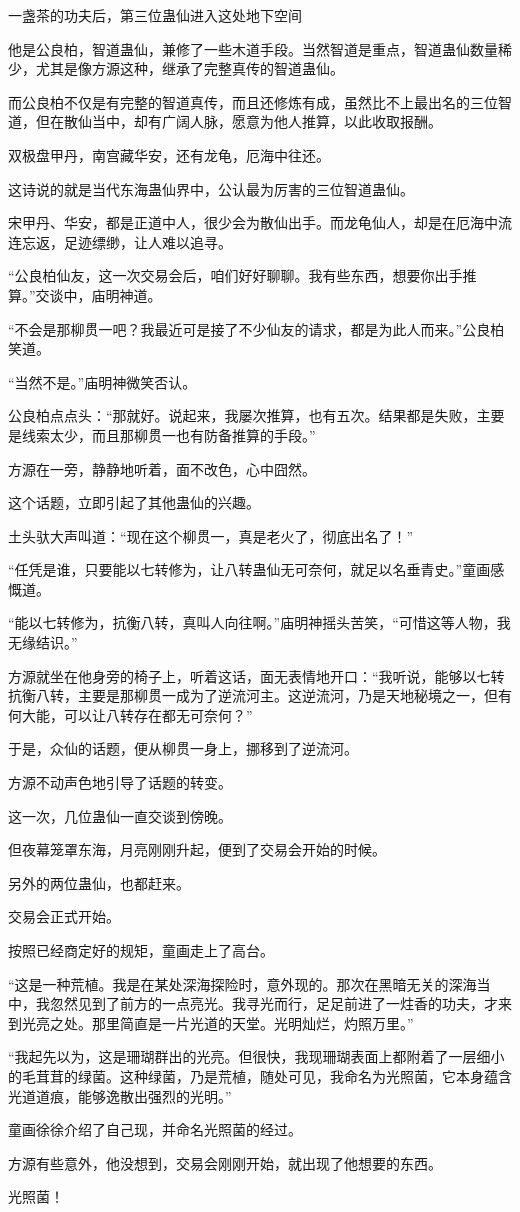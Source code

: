 \begin{this_body}
一盏茶的功夫后，第三位蛊仙进入这处地下空间

他是公良柏，智道蛊仙，兼修了一些木道手段。当然智道是重点，智道蛊仙数量稀少，尤其是像方源这种，继承了完整真传的智道蛊仙。

而公良柏不仅是有完整的智道真传，而且还修炼有成，虽然比不上最出名的三位智道，但在散仙当中，却有广阔人脉，愿意为他人推算，以此收取报酬。

双极盘甲丹，南宫藏华安，还有龙龟，厄海中往还。

这诗说的就是当代东海蛊仙界中，公认最为厉害的三位智道蛊仙。

宋甲丹、华安，都是正道中人，很少会为散仙出手。而龙龟仙人，却是在厄海中流连忘返，足迹缥缈，让人难以追寻。

“公良柏仙友，这一次交易会后，咱们好好聊聊。我有些东西，想要你出手推算。”交谈中，庙明神道。

“不会是那柳贯一吧？我最近可是接了不少仙友的请求，都是为此人而来。”公良柏笑道。

“当然不是。”庙明神微笑否认。

公良柏点点头：“那就好。说起来，我屡次推算，也有五次。结果都是失败，主要是线索太少，而且那柳贯一也有防备推算的手段。”

方源在一旁，静静地听着，面不改色，心中囧然。

这个话题，立即引起了其他蛊仙的兴趣。

土头驮大声叫道：“现在这个柳贯一，真是老火了，彻底出名了！”

“任凭是谁，只要能以七转修为，让八转蛊仙无可奈何，就足以名垂青史。”童画感慨道。

“能以七转修为，抗衡八转，真叫人向往啊。”庙明神摇头苦笑，“可惜这等人物，我无缘结识。”

方源就坐在他身旁的椅子上，听着这话，面无表情地开口：“我听说，能够以七转抗衡八转，主要是那柳贯一成为了逆流河主。这逆流河，乃是天地秘境之一，但有何大能，可以让八转存在都无可奈何？”

于是，众仙的话题，便从柳贯一身上，挪移到了逆流河。

方源不动声色地引导了话题的转变。

这一次，几位蛊仙一直交谈到傍晚。

但夜幕笼罩东海，月亮刚刚升起，便到了交易会开始的时候。

另外的两位蛊仙，也都赶来。

交易会正式开始。

按照已经商定好的规矩，童画走上了高台。

“这是一种荒植。我是在某处深海探险时，意外现的。那次在黑暗无关的深海当中，我忽然见到了前方的一点亮光。我寻光而行，足足前进了一炷香的功夫，才来到光亮之处。那里简直是一片光道的天堂。光明灿烂，灼照万里。”

“我起先以为，这是珊瑚群出的光亮。但很快，我现珊瑚表面上都附着了一层细小的毛茸茸的绿菌。这种绿菌，乃是荒植，随处可见，我命名为光照菌，它本身蕴含光道道痕，能够逸散出强烈的光明。”

童画徐徐介绍了自己现，并命名光照菌的经过。

方源有些意外，他没想到，交易会刚刚开始，就出现了他想要的东西。

光照菌！

\end{this_body}

